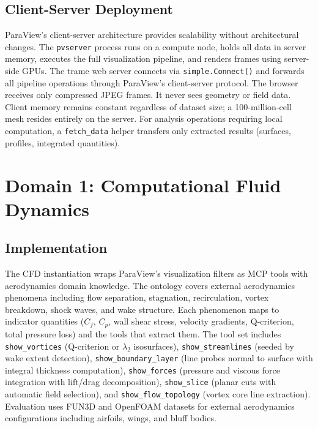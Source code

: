 \documentclass{vgtc}                          %
\begin{document}
\subsection{Client-Server Deployment}

ParaView's client-server architecture provides scalability without
architectural changes.
The \texttt{pvserver} process runs on a compute node, holds all data in server
memory, executes the full visualization pipeline, and renders frames using
server-side GPUs.
The trame web server connects via \texttt{simple.Connect()} and forwards all
pipeline operations through ParaView's client-server protocol.
The browser receives only compressed JPEG frames. It never sees geometry or
field data.
Client memory remains constant regardless of dataset size; a 100-million-cell
mesh resides entirely on the server.
For analysis operations requiring local computation, a \texttt{fetch\_data}
helper transfers only extracted results (surfaces, profiles, integrated
quantities).


\section{Domain 1: Computational Fluid Dynamics}
\label{sec:cfd}

\subsection{Implementation}

The CFD instantiation wraps ParaView's visualization filters as MCP tools with
aerodynamics domain knowledge.
The ontology covers external aerodynamics phenomena including flow separation,
stagnation, recirculation, vortex breakdown, shock waves, and wake structure.
Each phenomenon maps to indicator quantities ($C_f$, $C_p$, wall shear stress,
velocity gradients, Q-criterion, total pressure loss) and the tools that
extract them.
The tool set includes
\texttt{show\_vortices} (Q-criterion or $\lambda_2$ isosurfaces),
\texttt{show\_streamlines} (seeded by wake extent detection),
\texttt{show\_boundary\_layer} (line probes normal to surface with integral
thickness computation),
\texttt{show\_forces} (pressure and viscous force integration with lift/drag
decomposition),
\texttt{show\_slice} (planar cuts with automatic field selection),
and \texttt{show\_flow\_topology} (vortex core line extraction).
Evaluation uses FUN3D and OpenFOAM datasets for external aerodynamics
configurations including airfoils, wings, and bluff bodies.
\end{document}
